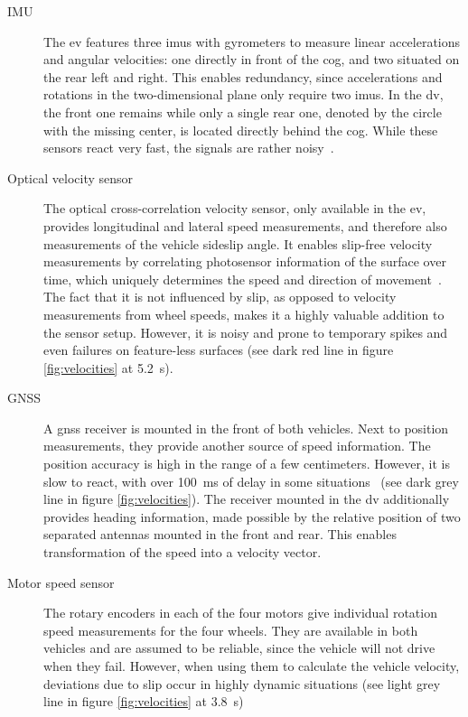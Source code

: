 \begin{description}
\item[IMU] The \gls{ev} features three \glspl{imu} with gyrometers to measure linear accelerations and angular velocities: one directly in front of the \gls{cog}, and two situated on the rear left and right. This enables redundancy, since accelerations and rotations in the two-dimensional plane only require two \glspl{imu}. In the \gls{dv}, the front one remains while only a single rear one, denoted by the circle with the missing center, is located directly behind the \gls{cog}. While these sensors react very fast, the signals are rather noisy~\cite[p.~19~ff.]{Biel.2019}.

\item[Optical velocity sensor] The optical cross-correlation velocity sensor, only available in the \gls{ev}, provides longitudinal and lateral speed measurements, and therefore also measurements of the vehicle sideslip angle. It enables slip-free velocity measurements by correlating photosensor information of the surface over time, which uniquely determines the speed and direction of movement~\cite{Bellof.4241993}. The fact that it is not influenced by slip, as opposed to velocity measurements from wheel speeds, makes it a highly valuable addition to the sensor setup. However, it is noisy and prone to temporary spikes and even failures on feature-less surfaces (see dark red line in figure \ref{fig:velocities} at \SI{5.2}{\second}).

\item[GNSS] A \gls{gnss} receiver is mounted in the front of both vehicles. Next to position measurements, they provide another source of speed information. The position accuracy is high in the range of a few centimeters. However, it is slow to react, with over \SI{100}{\milli\second} of delay in some situations~\cite[p.~27]{Biel.2019} (see dark grey line in figure \ref{fig:velocities}). The receiver mounted in the \gls{dv} additionally provides heading information, made possible by the relative position of two separated antennas mounted in the front and rear. This enables transformation of the speed into a velocity vector.

\item[Motor speed sensor] The rotary encoders in each of the four motors give individual rotation speed measurements for the four wheels. They are available in both vehicles and are assumed to be reliable, since the vehicle will not drive when they fail. However, when using them to calculate the vehicle velocity, deviations due to slip occur in highly dynamic situations (see light grey line in figure \ref{fig:velocities} at \SI{3.8}{\second})
\end{description}

